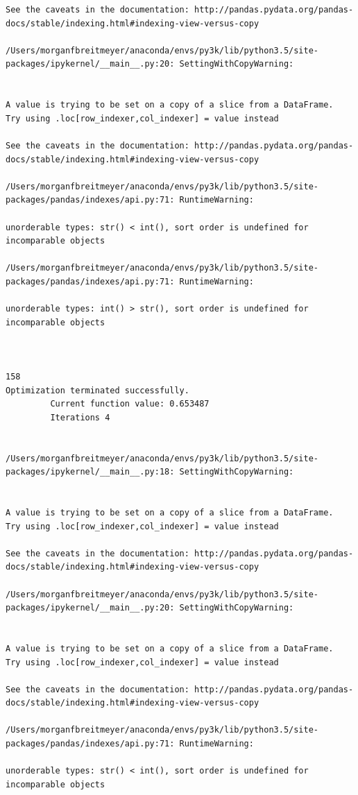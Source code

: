 \begin{lstlisting}
See the caveats in the documentation: http://pandas.pydata.org/pandas-docs/stable/indexing.html#indexing-view-versus-copy

/Users/morganfbreitmeyer/anaconda/envs/py3k/lib/python3.5/site-packages/ipykernel/__main__.py:20: SettingWithCopyWarning:


A value is trying to be set on a copy of a slice from a DataFrame.
Try using .loc[row_indexer,col_indexer] = value instead

See the caveats in the documentation: http://pandas.pydata.org/pandas-docs/stable/indexing.html#indexing-view-versus-copy

/Users/morganfbreitmeyer/anaconda/envs/py3k/lib/python3.5/site-packages/pandas/indexes/api.py:71: RuntimeWarning:

unorderable types: str() < int(), sort order is undefined for incomparable objects

/Users/morganfbreitmeyer/anaconda/envs/py3k/lib/python3.5/site-packages/pandas/indexes/api.py:71: RuntimeWarning:

unorderable types: int() > str(), sort order is undefined for incomparable objects



158
Optimization terminated successfully.
         Current function value: 0.653487
         Iterations 4


/Users/morganfbreitmeyer/anaconda/envs/py3k/lib/python3.5/site-packages/ipykernel/__main__.py:18: SettingWithCopyWarning:


A value is trying to be set on a copy of a slice from a DataFrame.
Try using .loc[row_indexer,col_indexer] = value instead

See the caveats in the documentation: http://pandas.pydata.org/pandas-docs/stable/indexing.html#indexing-view-versus-copy

/Users/morganfbreitmeyer/anaconda/envs/py3k/lib/python3.5/site-packages/ipykernel/__main__.py:20: SettingWithCopyWarning:


A value is trying to be set on a copy of a slice from a DataFrame.
Try using .loc[row_indexer,col_indexer] = value instead

See the caveats in the documentation: http://pandas.pydata.org/pandas-docs/stable/indexing.html#indexing-view-versus-copy

/Users/morganfbreitmeyer/anaconda/envs/py3k/lib/python3.5/site-packages/pandas/indexes/api.py:71: RuntimeWarning:

unorderable types: str() < int(), sort order is undefined for incomparable objects


\end{lstlisting}
